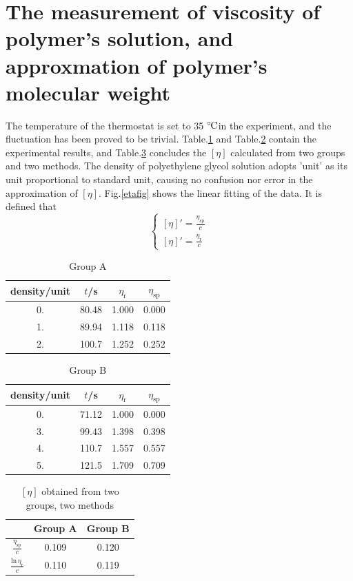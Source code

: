\documentclass[%
 reprint,
 amsmath,amssymb,
 aps,
]{revtex4-1}
\newcommand{\celsius}{\ensuremath{^\circ\hspace{-0.09em}\mathrm{C}}}
\begin{document}
\section{The measurement of viscosity of polymer's solution, and approxmation of polymer's molecular weight}

The temperature of the thermostat is set to 35 \celsius in the experiment, and the fluctuation has been proved to be trivial. Table.\ref{groupA} and Table.\ref{groupB} contain the experimental results, and Table.\ref{eta} concludes the $[\eta]$ calculated from two groups and two methods. The density of polyethylene glycol solution adopts 'unit' as its unit proportional to standard unit, causing no confusion nor error in the approximation of $[\eta]$. Fig.\ref{etafig} shows the linear fitting of the data. It is defined that
\begin{equation*}
\begin{cases}
[\eta]' = \frac{\eta_\text{sp}}{c}\\
[\eta]' = \frac{\eta_\text{r}}{c}
\end{cases}
\end{equation*}


\begin{table}
\centering
\caption{Group A}
\begin{tabular}{cccc}\hline
density/unit & $t$/s & $\eta_\text{r}$ & $\eta_\text{sp}$ \\\hline
0. & 80.48 & 1.000 & 0.000 \\
1. & 89.94 & 1.118 & 0.118 \\
2. & 100.7 & 1.252 & 0.252 \\\hline
\end{tabular}
\label{groupA}
\end{table}

\begin{table}
\centering
\caption{Group B}
\begin{tabular}{cccc}\hline
density/unit & $t$/s & $\eta_\text{r}$ & $\eta_\text{sp}$ \\\hline
0. & 71.12 & 1.000 & 0.000 \\
3. & 99.43 & 1.398 & 0.398 \\
4. & 110.7 & 1.557 & 0.557 \\
5. & 121.5 & 1.709 & 0.709 \\\hline
\end{tabular}
\label{groupB}
\end{table}

\begin{table}
\centering
\caption{$[\eta]$ obtained from two groups, two methods}
\begin{tabular}{|c|cc|}\hline
& Group A & Group B \\\hline
$\frac{\eta_\text{sp}}{c}$ & 0.109 & 0.120 \\
$\frac{\mathrm{ln} \, \eta_\text{r}}{c}$ & 0.110 & 0.119 \\\hline
\end{tabular}
\label{eta}
\end{table}
\end{document}
